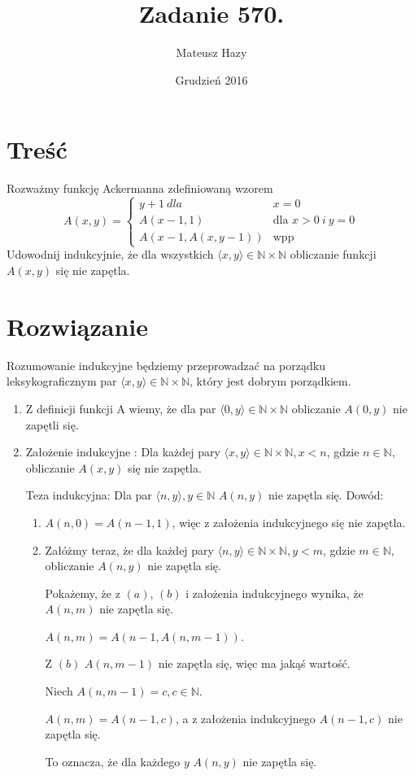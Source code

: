 \documentclass{article}
\title{Zadanie 570.}
\author{Mateusz Hazy }
\date{Grudzień 2016}
\begin{document}
\maketitle
\section{Treść}
	Rozważmy funkcję Ackermanna zdefiniowaną wzorem \newline
    $$ A (x, y) =\left\{ \begin{array}{ll}
    y+1 \ dla  & \textrm{$x = 0$}\\
    A (x-1, 1) & \textrm{dla $x>0 \ i \ y=0$}\\
    A(x-1, A(x, y-1)) &  \textrm{wpp}
    \end{array} \right.
    $$
    Udowodnij indukcyjnie, że dla wszystkich $ \langle x, y \rangle \in \mathbb{N}\times\mathbb{N} $  obliczanie funkcji $A(x,y)$ się nie zapętla.
\section{Rozwiązanie}

	\par \hspace{0.4cm} Rozumowanie indukcyjne będziemy przeprowadzać na porządku leksykograficznym par
	$ \langle x, y \rangle \in \mathbb{N}\times\mathbb{N} $, który jest dobrym porządkiem.
	\begin{enumerate}
	\item Z definicji funkcji A wiemy, że dla par $ \langle 0, y \rangle \in \mathbb{N}\times\mathbb{N} $ obliczanie $A(0, y)$ nie zapętli się. 
	\item Założenie indukcyjne : Dla każdej pary $ \langle x, y \rangle \in \mathbb{N}\times\mathbb{N}, x<n $, gdzie $n \in \mathbb{N}$, obliczanie $A(x, y)$ się nie zapętla. 
	\par Teza indukcyjna: Dla par $ \langle n, y \rangle, y \in \mathbb{N} $ $ A(n, y)$ nie zapętla się. \newline
	Dowód: 
		\begin{enumerate}
	\item $ A(n, 0) = A (n-1, 1) $, więc z założenia indukcyjnego się nie zapętla. 
	\item Załóżmy teraz, że dla każdej pary $ \langle n, y \rangle \in \mathbb{N}\times\mathbb{N}, y<m $, 	gdzie $m \in \mathbb{N}$, obliczanie $A(n, y)$ nie zapętla się. 
	\par Pokażemy, że z $(a)$, $(b)$ i założenia indukcyjnego wynika, że $A(n, m)$ nie zapętla się. 
	 \par $A(n, m)= A (n-1, A(n, m-1))$.
	\par Z $(b)$ $A(n, m-1)$ nie zapętla się, więc ma jakąś wartość. 
	\par Niech $A(n, m-1)= c, c \in \mathbb{N}$. 
	\par $A(n, m)= A (n-1, c)$, a z założenia indukcyjnego $A(n-1, c)$ nie zapętla się. 
	\par To oznacza, że dla każdego $y$ $A(n, y)$ nie zapętla się.
	\end{enumerate}
	\end{enumerate}
\end{document}

